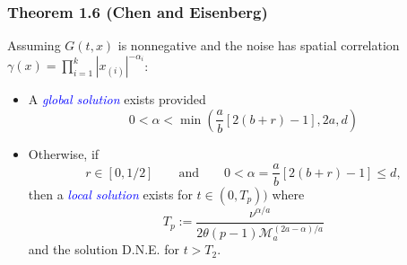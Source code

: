 \documentclass{beamer}%
\numberwithin{equation}{section}
\begin{document}
	\begin{frame}[t]
		\frametitle{Theorem 1.6 (Chen and Eisenberg)}
		Assuming $G(t,x)$ is nonnegative and the noise has spatial correlation $\gamma(x) = \prod_{i=1}^k |x_{(i)}|^{-\alpha_i}$:
		\begin{itemize}
			\item A \textcolor{blue}{\textit{global solution}} exists provided
			\[
			0 < \alpha < \min\left( \frac{a}{b}[2(b+r) -1], 2a, d \right)
			\]
			\item Otherwise, if
			\[
			r\in \left[0,1/2\right] \qquad \text{and} \qquad
			0<\alpha = \frac{a}{b}[2(b+r)-1] \le d,
			\]
			then a \textcolor{blue}{\textit{local solution}} exists for $t \in (0,T_p))$ where
			\[
			T_p := \dfrac{\nu^{\alpha/a}}{2 \theta (p-1) \mathcal{M}_a^{(2a-\alpha)/a}}
			\]
			and the solution D.N.E. for $t > T_2$.
		\end{itemize}
	\end{frame}
\end{document}
